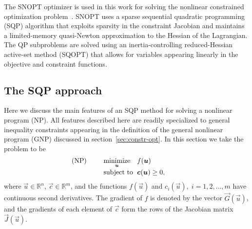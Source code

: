 \documentclass[twocolumn,numbook]{svjour3}          %
\makeatletter
\def\u{{\vec u}}
\def\c{{\vec c}}
\def\x{{\vec x}}
\def\s{{\vec s}}
\def\g{{\vec{G}}}
\def\blambda{{\pmb{\lambda}}}%
\def\J{{\vec J}}
\def\minim{\mathop{\hbox{\rm minimize}}}
\def\minimize#1{{\displaystyle\minim_{#1}}}
\def\nthinsp{\mskip -2   mu}
\def\blambdahat{\skew1\widehat \blambda}
\def\blambdastar{\blambda\superstar}
\def\shat{\widehat \s}
\def\sstar{\s\superstar}
\def\subject{\mbox{\rm subject to}}
\def\superstar{^{\raise 0.5pt\hbox{$\nthinsp *$}}}
\def\xstar{\x\superstar}
\def\uhat{\skew{2.8}\widehat \u}
\def\ustar{\u\superstar}
\def\GQPk{GQP$_k$}
\def\SNOPT {{\small SNOPT}}
\def\SQOPT {{\small SQOPT}}
\def\problem#1#2#3#4{%
   {\begin{tabular*}{0.47\textwidth}
    {@{}l@{\extracolsep{\fill}}l@{\extracolsep{6pt}}l@{\extracolsep{\fill}}c@{}}
      #1 & $\minimize{#2}$ & $#3$ & $ $ \\[5pt]
         & $\subject$      & $#4$ & $ $
    \end{tabular*}}}
\makeatother
\begin{document}
The \SNOPT{} optimizer is used in this work for solving the nonlinear constrained
optimization problem~\cite{SNOPT}. \SNOPT{} uses a sparse sequential quadratic
programming (SQP) algorithm that exploits sparsity in
the constraint Jacobian and maintains a limited-memory quasi-Newton
approximation to the Hessian of the Lagrangian. The QP
subproblems are solved using an inertia-controlling reduced-Hessian
active-set method (\SQOPT) that allows for variables appearing
linearly in the objective and constraint functions. 
 
\subsection{The SQP approach}

%


Here we discuss the main features of an SQP method for solving a
nonlinear program (NP).  All features described here are readily 
specialized to general inequality constraints appearing in the 
definition of the general nonlinear program (GNP) discussed in 
section~\ref{sec:constr-opt}. In this section we take the problem to be
$$
   \problem{(NP)}{\u}{f(\u)}{\c(\u) \ge 0,}
$$
where $\u \in \mathbb R^n$, $\c \in \mathbb R^m$, and the functions $f(\u)$ and $c_i(\u), \; i=1,2,\ldots,m$
have continuous second derivatives. The gradient of $f$ is denoted
by the vector $\g(\u)$, and the gradients of each element of $\c$ form
the rows of the Jacobian matrix $\J(\u)$.
\end{document}
